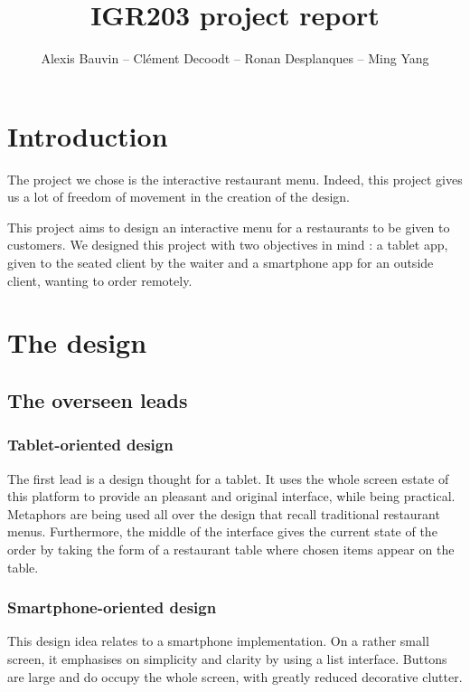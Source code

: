 \documentclass[a4paper,12pt]{article}
\title{IGR203 project report}
\author{Alexis Bauvin -- Clément Decoodt -- Ronan Desplanques -- Ming Yang}
\begin{document}
\maketitle

\tableofcontents

\section*{Introduction}

The project we chose is the interactive restaurant menu. Indeed, this project gives us a lot of freedom of movement
in the creation of the design.

This project aims to design an interactive menu for a restaurants to be given to customers. We designed this project
with two objectives in mind : a tablet app, given to the seated client by the waiter and a smartphone app for an
outside client, wanting to order remotely.

\newpage

\section{The design}

\subsection{The overseen leads}

\subsubsection{Tablet-oriented design}

The first lead is a design thought for a tablet. It uses the whole screen estate of this platform to provide an
pleasant and original interface, while being practical. Metaphors are being used all over the design that recall
traditional restaurant menus. Furthermore, the middle of the interface gives the current state of the order by taking
the form of a restaurant table where chosen items appear on the table.

\subsubsection{Smartphone-oriented design}

This design idea relates to a smartphone implementation. On a rather small screen, it emphasises on simplicity and
clarity by using a list interface. Buttons are large and do occupy the whole screen, with greatly reduced decorative
clutter.
\end{document}
